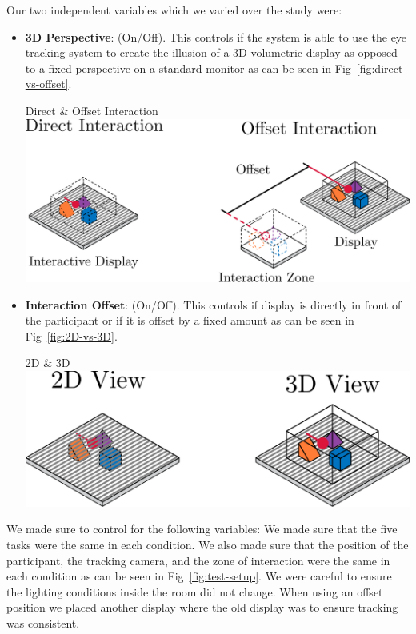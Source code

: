 Our two independent variables which we varied over the study were: 
\begin{itemize}[itemsep=-0.25em]
	\item \textbf{3D Perspective}: (On/Off). This controls if the system is able to use the eye tracking system to create the illusion of a 3D volumetric display as opposed to a fixed perspective on a standard monitor as can be seen in Fig~\ref{fig:direct-vs-offset}.
	\begin{figureBox}[label={fig:direct-vs-offset}, width=0.8\linewidth]{Direct \& Offset Interaction}
		\includegraphics[width = 0.8\linewidth]{./implementation/figures/direct-vs-offset.pdf}
	\end{figureBox}
	\item \textbf{Interaction Offset}: (On/Off). This controls if display is directly in front of the participant or if it is offset by a fixed amount as can be seen in Fig~\ref{fig:2D-vs-3D}.
	\begin{figureBox}[label={fig:2D-vs-3D}, width=0.8\linewidth]{2D \& 3D}
		\includegraphics[width = 0.8\linewidth]{./implementation/figures/2D-vs-3D.pdf}
	\end{figureBox}
	
\end{itemize}

We made sure to control for the following variables: We made sure that the five tasks were the same in each condition. We also made sure that the position of the participant, the tracking camera, and the zone of interaction were the same in each condition as can be seen in Fig~\ref{fig:test-setup}. We were careful to ensure the lighting conditions inside the room did not change. When using an offset position we placed another display where the old display was to ensure tracking was consistent.

